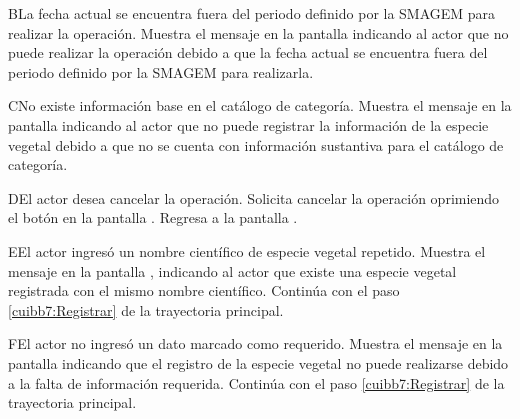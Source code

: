    \begin{UCtrayectoriaA}{B}{La fecha actual se encuentra fuera del periodo definido por la SMAGEM para realizar la operación.}
    \UCpaso[\UCsist] Muestra el mensaje  en la pantalla  indicando al actor que no puede realizar la operación debido a que la fecha actual se encuentra fuera del periodo definido por la SMAGEM para realizarla. 
 \end{UCtrayectoriaA}
 
 \begin{UCtrayectoriaA}{C}{No existe información base en el catálogo de categoría.}
    \UCpaso[\UCsist] Muestra el mensaje  en la pantalla  indicando al actor que no puede registrar la información de la especie vegetal debido a que no se cuenta con información sustantiva para el catálogo de categoría.
 \end{UCtrayectoriaA}
 
    \begin{UCtrayectoriaA}{D}{El actor desea cancelar la operación.}
    \UCpaso[\UCactor] Solicita cancelar la operación oprimiendo el botón  en la pantalla .
    \UCpaso[] Regresa a la pantalla . 
    \end{UCtrayectoriaA}
  
   \begin{UCtrayectoriaA}{E}{El actor ingresó un nombre científico de especie vegetal repetido.}
    \UCpaso[\UCsist] Muestra el mensaje  en la pantalla , indicando al actor que existe una especie vegetal registrada con el mismo nombre científico.
    \UCpaso[] Continúa con el paso \ref{cuibb7:Registrar} de la trayectoria principal.
 \end{UCtrayectoriaA}
 
    \begin{UCtrayectoriaA}{F}{El actor no ingresó un dato marcado como requerido.}    
    \UCpaso[\UCsist] Muestra el mensaje  en la pantalla  indicando que el registro de la especie vegetal no puede realizarse debido a la falta de información requerida.
    \UCpaso[] Continúa con el paso \ref{cuibb7:Registrar} de la trayectoria principal.     
    \end{UCtrayectoriaA}
 
